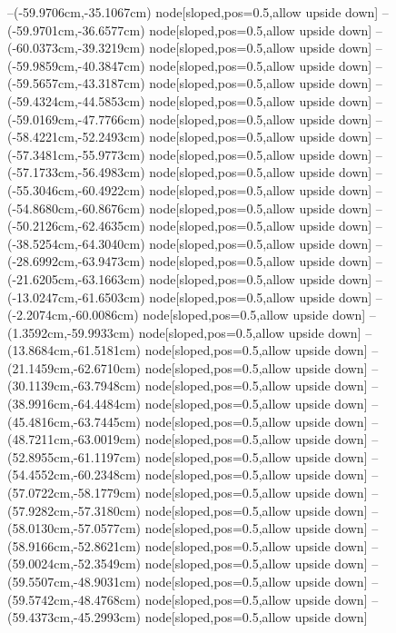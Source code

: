 --(-59.9706cm,-35.1067cm) node[sloped,pos=0.5,allow upside down]{\ArrowIn}
--(-59.9701cm,-36.6577cm) node[sloped,pos=0.5,allow upside down]{\ArrowIn}
--(-60.0373cm,-39.3219cm) node[sloped,pos=0.5,allow upside down]{\ArrowIn}
--(-59.9859cm,-40.3847cm) node[sloped,pos=0.5,allow upside down]{\ArrowIn}
--(-59.5657cm,-43.3187cm) node[sloped,pos=0.5,allow upside down]{\ArrowIn}
--(-59.4324cm,-44.5853cm) node[sloped,pos=0.5,allow upside down]{\ArrowIn}
--(-59.0169cm,-47.7766cm) node[sloped,pos=0.5,allow upside down]{\ArrowIn}
--(-58.4221cm,-52.2493cm) node[sloped,pos=0.5,allow upside down]{\ArrowIn}
--(-57.3481cm,-55.9773cm) node[sloped,pos=0.5,allow upside down]{\ArrowIn}
--(-57.1733cm,-56.4983cm) node[sloped,pos=0.5,allow upside down]{\arrowIn}
--(-55.3046cm,-60.4922cm) node[sloped,pos=0.5,allow upside down]{\ArrowIn}
--(-54.8680cm,-60.8676cm) node[sloped,pos=0.5,allow upside down]{\arrowIn}
--(-50.2126cm,-62.4635cm) node[sloped,pos=0.5,allow upside down]{\ArrowIn}
--(-38.5254cm,-64.3040cm) node[sloped,pos=0.5,allow upside down]{\ArrowIn}
--(-28.6992cm,-63.9473cm) node[sloped,pos=0.5,allow upside down]{\ArrowIn}
--(-21.6205cm,-63.1663cm) node[sloped,pos=0.5,allow upside down]{\ArrowIn}
--(-13.0247cm,-61.6503cm) node[sloped,pos=0.5,allow upside down]{\ArrowIn}
--(-2.2074cm,-60.0086cm) node[sloped,pos=0.5,allow upside down]{\ArrowIn}
--(1.3592cm,-59.9933cm) node[sloped,pos=0.5,allow upside down]{\ArrowIn}
--(13.8684cm,-61.5181cm) node[sloped,pos=0.5,allow upside down]{\ArrowIn}
--(21.1459cm,-62.6710cm) node[sloped,pos=0.5,allow upside down]{\ArrowIn}
--(30.1139cm,-63.7948cm) node[sloped,pos=0.5,allow upside down]{\ArrowIn}
--(38.9916cm,-64.4484cm) node[sloped,pos=0.5,allow upside down]{\ArrowIn}
--(45.4816cm,-63.7445cm) node[sloped,pos=0.5,allow upside down]{\ArrowIn}
--(48.7211cm,-63.0019cm) node[sloped,pos=0.5,allow upside down]{\ArrowIn}
--(52.8955cm,-61.1197cm) node[sloped,pos=0.5,allow upside down]{\ArrowIn}
--(54.4552cm,-60.2348cm) node[sloped,pos=0.5,allow upside down]{\ArrowIn}
--(57.0722cm,-58.1779cm) node[sloped,pos=0.5,allow upside down]{\ArrowIn}
--(57.9282cm,-57.3180cm) node[sloped,pos=0.5,allow upside down]{\ArrowIn}
--(58.0130cm,-57.0577cm) node[sloped,pos=0.5,allow upside down]{\arrowIn}
--(58.9166cm,-52.8621cm) node[sloped,pos=0.5,allow upside down]{\ArrowIn}
--(59.0024cm,-52.3549cm) node[sloped,pos=0.5,allow upside down]{\arrowIn}
--(59.5507cm,-48.9031cm) node[sloped,pos=0.5,allow upside down]{\ArrowIn}
--(59.5742cm,-48.4768cm) node[sloped,pos=0.5,allow upside down]{\arrowIn}
--(59.4373cm,-45.2993cm) node[sloped,pos=0.5,allow upside down]{\ArrowIn}
